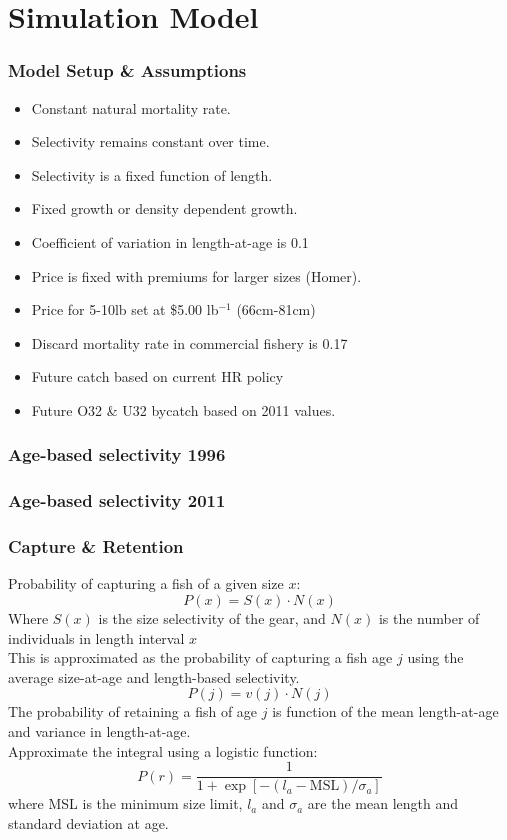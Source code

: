 \documentclass{beamer}
\begin{document}
\section{Simulation Model} %
\label{sec:simulation_model}
\begin{frame}[t]\frametitle{Model Setup \& Assumptions}
	\begin{itemize}
		\item<1->\alert<1> {Constant natural mortality rate.}
		\item<1->\alert<2> {Selectivity remains constant over time.}
		\item<1->\alert<3> {Selectivity is a fixed function of length.}
		\item<1->\alert<4> {Fixed growth or density dependent growth.}
		\item<1->\alert<5> {Coefficient of variation in length-at-age is 0.1}
		\item<1->\alert<6> {Price is fixed with premiums for larger sizes (Homer).}
		\item<1->\alert<6> {Price for 5-10lb set at \$5.00 lb$^{-1}$ (66cm-81cm)}
		\item<1->\alert<7> {Discard mortality rate in commercial fishery is 0.17}
		\item<1->\alert<8> {Future catch based on current HR policy}
		\item<1->\alert<8> {Future O32 \& U32 bycatch based on 2011 values.}
	\end{itemize}
\end{frame}
%
\begin{frame}[t]\frametitle{Age-based selectivity 1996}
\end{frame}
%
\begin{frame}[t]\frametitle{Age-based selectivity 2011}
\end{frame}
%
\begin{frame}[t,shrink]\frametitle{Capture \& Retention}
	Probability of capturing a fish of a given size $x$:
	\[
	 P(x) = S(x)\cdot N(x)
	\]
	Where $S(x)$ is the size selectivity of the gear, and $N(x)$ is the number of individuals in length interval $x$\\
	\medskip \pause
	This is approximated as the probability of capturing a fish age $j$ using the average size-at-age and length-based selectivity.
	\[
	P(j) = v(j) \cdot N(j)
	\]
	\pause
	The probability of retaining a fish of age $j$ is function of the mean length-at-age and variance in length-at-age.\\
	Approximate the integral using a logistic function:
	\[
	P(r) = \frac{1}{1+\exp[-(l_a-\mathrm{MSL})/\sigma_a]}
	\]
	where MSL is the minimum size limit, $l_a$ and $\sigma_a$ are the mean length and standard deviation at age.
\end{frame}
\end{document}
